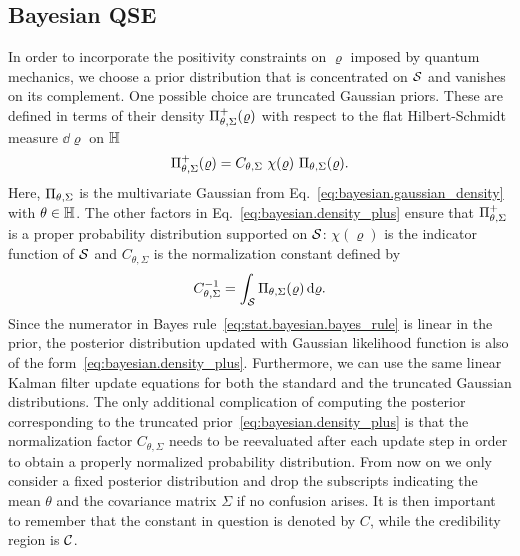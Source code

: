 \subsection{Bayesian QSE}
\label{sub:bayesian.tomography}

In order to incorporate the positivity constraints on $\varrho$ imposed by quantum mechanics, we choose a prior distribution that is concentrated on $\mathcal{S}$ and vanishes on its complement.
One possible choice are truncated Gaussian priors.
These are defined in terms of their density $\Pi_{\theta,\Sigma}^+(\varrho)$ with respect to the flat Hilbert-Schmidt measure $\dd\varrho$ on $\mathbb{H}$
\begin{equation}
  \label{eq:bayesian.density_plus}
  \Pdf^+_{\theta,\Sigma}(\varrho) = C_{\theta,\Sigma}\ \chi(\varrho)\ \Pdf_{\theta,\Sigma}(\varrho).
\end{equation}
Here, $\Pi_{\theta,\Sigma}$ is the multivariate Gaussian from Eq.~\eqref{eq:bayesian.gaussian_density} with $\theta \in \mathbb{H}$.
The other factors in Eq.~\eqref{eq:bayesian.density_plus} ensure that $\Pi^+_{\theta,\Sigma}$ is a proper probability distribution supported on $\mathcal{S}$:
$\chi(\varrho)$ is the indicator function of $\mathcal{S}$ and $C_{\theta,\Sigma}$ is the normalization constant defined by
\begin{equation}
  \label{eq:bayes.normalization_factor}
  C_{\theta,\Sigma}^{-1} = \int_{\mathcal{S}} \Pi_{\theta,\Sigma}(\varrho) \,\mathrm{d}\varrho.
\end{equation}
Since the numerator in Bayes rule~\eqref{eq:stat.bayesian.bayes_rule} is linear in the prior, the posterior distribution updated with Gaussian likelihood function is also of the form~\eqref{eq:bayesian.density_plus}.
Furthermore, we can use the same linear Kalman filter update equations for both the standard and the truncated Gaussian distributions.
The only additional complication of computing the posterior corresponding to the truncated prior~\eqref{eq:bayesian.density_plus} is that the normalization factor $C_{\theta,\Sigma}$ needs to be reevaluated after each update step in order to obtain a properly normalized probability distribution.
From now on we only consider a fixed posterior distribution and drop the subscripts indicating the mean $\theta$ and the covariance matrix $\Sigma$ if no confusion arises.
It is then important to remember that the constant in question is denoted by $C$, while the credibility region is $\mathcal{C}$.

